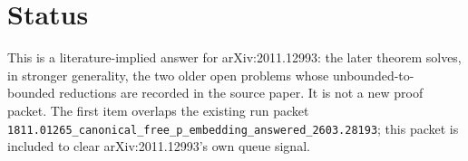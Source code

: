 \documentclass[11pt]{article}
\begin{document}
\section*{Status}

This is a literature-implied answer for arXiv:2011.12993: the later theorem
solves, in stronger generality, the two older open problems whose unbounded-to-
bounded reductions are recorded in the source paper. It is not a new proof
packet. The first item overlaps the existing run packet
\texttt{1811.01265\_canonical\_free\_p\_embedding\_answered\_2603.28193}; this
packet is included to clear arXiv:2011.12993's own queue signal.
\end{document}
